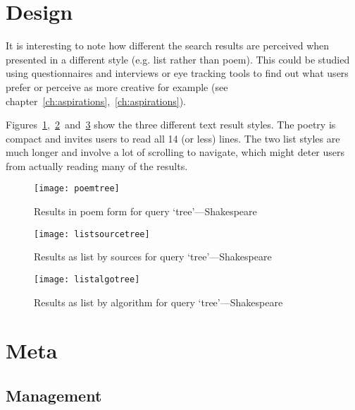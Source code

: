 \section{Design}

It is interesting to note how different the search results are perceived when presented in a different style (e.g. list rather than poem). This could be studied using questionnaires and interviews or eye tracking tools to find out what users prefer or perceive as more creative for example (see chapter~\ref{ch:aspirations},~\ref{ch:aspirations}). 

Figures~\ref{fig:poemtree},~\ref{fig:listsourcetree}~and~\ref{fig:listalgotree} show the three different text result styles. The poetry is compact and invites users to read all \num{14} (or less) lines. The two list styles are much longer and involve a lot of scrolling to navigate, which might deter users from actually reading many of the results.

\begin{figure}[!htbp]
\centering
  \texttt{[image: poemtree]}
\caption[Results as poem]{Results in poem form for query `tree'---Shakespeare}
\label{fig:poemtree}
\end{figure}

\begin{figure}[!htbp]
\centering
  \texttt{[image: listsourcetree]}
\caption[Results as list by sources]{Results as list by sources for query `tree'---Shakespeare}
\label{fig:listsourcetree}
\end{figure}

\begin{figure}[!htbp]
\centering
  \texttt{[image: listalgotree]}
\caption[Results as list by algorithm]{Results as list by algorithm for query `tree'---Shakespeare}
\label{fig:listalgotree}
\end{figure}


\section{Meta}

\subsection{Management}

